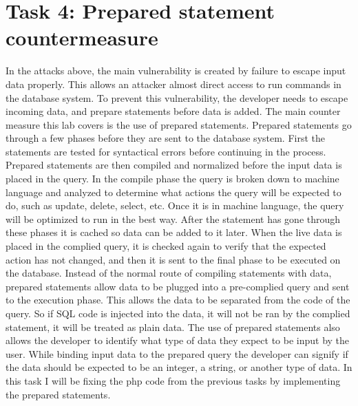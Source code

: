 \documentclass[14pt]{extarticle}
\begin{document}
\section{Task 4: Prepared statement countermeasure}
In the attacks above, the main vulnerability is created by failure to escape input data properly. This allows an attacker almost direct access to run commands in the database system. To prevent this vulnerability, the developer needs to escape incoming data, and prepare statements before data is added. The main counter measure this lab covers is the use of prepared statements. Prepared statements go through a few phases before they are sent to the database system. First the statements are tested for syntactical errors before continuing in the process. Prepared statements are then compiled and normalized before the input data is placed in the query. In the compile phase the query is broken down to machine language and analyzed to determine what actions the query will be expected to do, such as update, delete, select, etc. Once it is in machine language, the query will be optimized to run in the best way. After the statement has gone through these phases it is cached so data can be added to it later. When the live data is placed in the complied query, it is checked again to verify that the expected action has not changed, and then it is sent to the final phase to be executed on the database\cite{seed-sqlatk}.
Instead of the normal route of compiling statements with data, prepared statements allow data to be plugged into a pre-complied query and sent to the execution phase. This allows the data to be separated from the code of the query. So if SQL code is injected into the data, it will not be ran by the complied statement, it will be treated as plain data\cite{seed-sqlatk}.
The use of prepared statements also allows the developer to identify what type of data they expect to be input by the user. While binding input data to the prepared query the developer can signify if the data should be expected to be an integer, a string, or another type of data\cite{seed-sqlatk}. In this task I will be fixing the php code from the previous tasks by implementing the prepared statements.
\end{document}

